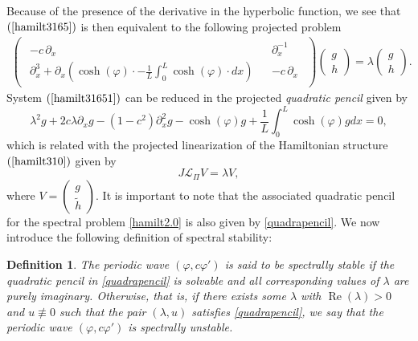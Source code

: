 \documentclass[12pt,reqno,a4paper]{amsart} %
\newtheorem{defi}{Definition}[section]
\numberwithin{equation}{section}
\numberwithin{figure}{section}
\begin{document}
 Because of the presence of the derivative in the hyperbolic function, we see that $(\ref{hamilt3165})$ is then equivalent to the following projected problem
 \begin{align}\label{hamilt31651}
 	\begin{pmatrix}
 		\begin{array}{ccc}
 			-c \, \partial_x && \partial_x^{-1} \\
 			\partial_x^3 + \partial_x\left(\cosh(\varphi)\cdot-\frac{1}{L}\int_0^L\cosh(\varphi)\cdot dx\right)  && -c \, \partial_x
 		\end{array}
 	\end{pmatrix}
 	\begin{pmatrix}
 		g \\ h
 	\end{pmatrix}=\lambda\begin{pmatrix}
 		g \\ h
 	\end{pmatrix}.
 	 \end{align} 
 System $(\ref{hamilt31651})$ can be reduced in the projected \textit{quadratic pencil} given by
 \begin{equation}\label{quadrapencil}
 \lambda^2g+2c\lambda \partial_xg-(1-c^2)\partial_x^2g-\cosh(\varphi)g+\frac{1}{L}\int_0^L\cosh(\varphi)gdx=0,
 \end{equation}
 which is related with the projected linearization of the Hamiltonian structure $(\ref{hamilt310})$ given by
 \begin{equation}\label{hamilt2.0}
 		 J\mathcal{L}_{\Pi}V=\lambda V,
 	 \end{equation}  where $V=\begin{pmatrix}
 g\\
\tilde{h}
 \end{pmatrix}.$ It is important to note that the associated quadratic pencil for the spectral problem \eqref{hamilt2.0} is also given by \eqref{quadrapencil}. We now introduce the following definition of spectral stability:
 
 \begin{defi}\label{def.spc.ins}
 	The periodic wave $(\varphi, c\varphi')$ is said to be spectrally stable if the quadratic pencil in \eqref{quadrapencil} is solvable and all corresponding values of $\lambda$ are purely imaginary. Otherwise, that is, if there exists some $\lambda$ with $\operatorname{Re}(\lambda)>0$ and $u\not\equiv 0$ such that the pair $(\lambda,u)$ satisfies \eqref{quadrapencil}, we say that the periodic wave $(\varphi, c\varphi')$ is spectrally unstable.
 \end{defi}
 
\end{document}
